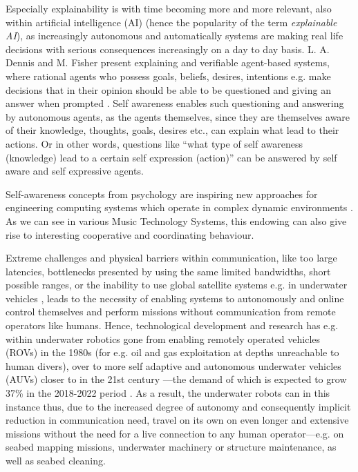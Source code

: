 Especially explainability is with time becoming more and more relevant, also within artificial intelligence (AI) (hence the popularity of the term \textit{explainable AI}), as increasingly autonomous and automatically systems are making real life decisions with serious consequences increasingly on a day to day basis. L. A. Dennis and M. Fisher present explaining and verifiable agent-based systems, where rational agents who possess goals, beliefs, desires, intentions e.g. make decisions that in their opinion should be able to be questioned and giving an answer when prompted \cite{verifiable_and_questionable_agents}. Self awareness enables such questioning and answering by autonomous agents, as the agents themselves, since they are themselves aware of their knowledge, thoughts, goals, desires etc., can explain what lead to their actions. Or in other words, questions like ``what type of self awareness \cite{sacs16_ch2} (knowledge) lead to a certain self expression \cite{sacs16_ch2} (action)'' can be answered by self aware and self expressive agents.

Self-awareness concepts from psychology are inspiring new approaches for engineering computing systems which operate in complex dynamic environments \cite{sacs16_ch2}. As we can see in various Music Technology Systems, this endowing can also give rise to interesting cooperative and coordinating behaviour.

Extreme challenges and physical barriers within communication, like too large latencies, bottlenecks presented by using the same limited bandwidths, short possible ranges, or the inability to use global satellite systems e.g. in underwater vehicles \cite{petillot_underwater_robots}, leads to the necessity of enabling systems to autonomously and online control themselves and perform missions without communication from remote operators like humans. Hence, technological development and research has e.g. within underwater robotics gone from enabling remotely operated vehicles (ROVs) in the 1980s (for e.g. oil and gas exploitation at depths unreachable to human divers), over to more self adaptive and autonomous underwater vehicles (AUVs) closer to in the 21st century —the demand of which is expected to grow 37\% in the 2018-2022 period \cite{petillot_underwater_robots}. As a result, the underwater robots can in this instance thus, due to the increased degree of autonomy and consequently implicit reduction in communication need, travel on its own on even longer and extensive missions without the need for a live connection to any human operator—e.g. on seabed mapping missions, underwater machinery or structure maintenance, as well as seabed cleaning.

